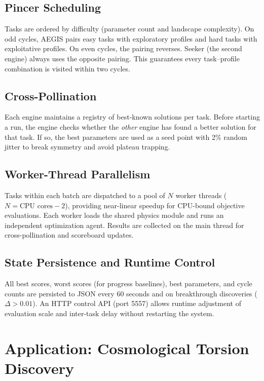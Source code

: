 \documentclass[12pt,preprint]{aastex631}
\begin{document}
\subsection{Pincer Scheduling}

Tasks are ordered by difficulty (parameter count and landscape complexity).
On odd cycles, AEGIS pairs easy tasks with exploratory profiles and
hard tasks with exploitative profiles. On even cycles, the pairing
reverses. Seeker (the second engine) always uses the opposite pairing.
This guarantees every task--profile combination is visited within
two cycles.

\subsection{Cross-Pollination}

Each engine maintains a registry of best-known solutions per task.
Before starting a run, the engine checks whether the \emph{other}
engine has found a better solution for that task. If so, the best
parameters are used as a seed point with 2\% random jitter to
break symmetry and avoid plateau trapping.

\subsection{Worker-Thread Parallelism}

Tasks within each batch are dispatched to a pool of $N$ worker threads
($N = \text{CPU cores} - 2$), providing near-linear speedup for
CPU-bound objective evaluations. Each worker loads the shared
physics module and runs an independent optimization agent.
Results are collected on the main thread for cross-pollination
and scoreboard updates.

\subsection{State Persistence and Runtime Control}

All best scores, worst scores (for progress baselines), best parameters,
and cycle counts are persisted to JSON every 60 seconds and on
breakthrough discoveries ($\Delta > 0.01$). An HTTP control API
(port 5557) allows runtime adjustment of evaluation scale and
inter-task delay without restarting the system.

\section{Application: Cosmological Torsion Discovery}
\label{sec:results}
\end{document}
